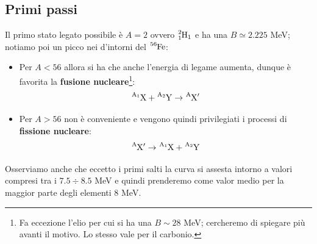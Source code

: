 \subsection{Primi passi} 
Il primo stato legato possibile è $A=2$ ovvero $\ce{^2_1H_1}$ e ha una $B\simeq 2.225$ MeV; notiamo poi un picco nei d'intorni del $\ce{^56Fe}$:
\begin{itemize}
    \item Per $A<56$ allora si ha che  anche l'energia di legame aumenta, dunque è favorita la \textbf{fusione nucleare}\footnote{Fa eccezione l'elio per cui si ha una $B\sim 28$ MeV; cercheremo di spiegare più avanti il motivo. Lo stesso vale per il carbonio.}:
    $$\ce{^{A_1}X} + \ce{^{A_2}Y} \to \ce{^AX}'$$
    \item Per $A>56$  non è conveniente e vengono quindi privilegiati i processi di \textbf{fissione nucleare}:
    $$\ce{^AX}' \to \ce{^{A_1}X} + \ce{^{A_2}Y}$$
\end{itemize}
\noindent Osserviamo anche che eccetto i primi salti la curva si assesta intorno a valori compresi tra i $7.5 \div 8.5$ MeV e quindi prenderemo come valor medio per la maggior parte degli elementi 8 MeV.

